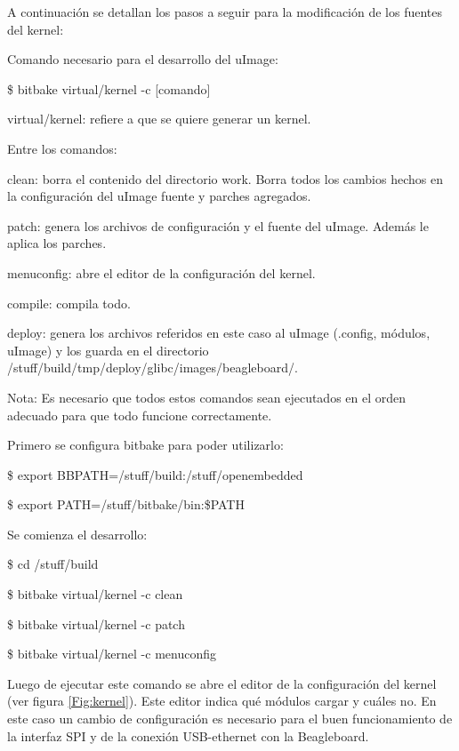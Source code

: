 \bigskip
A continuación se detallan los pasos a seguir para la modificación de los fuentes del kernel:
 
\bigskip 
Comando necesario para el desarrollo del uImage:

\bigskip
\centerline{\$ bitbake virtual/kernel -c [comando]}

\bigskip
virtual/kernel: refiere a que se quiere generar un kernel.

\bigskip
Entre los comandos:

\bigskip
clean: borra el contenido del directorio work. Borra todos los cambios hechos en la configuración del uImage fuente y parches agregados.

patch: genera los archivos de configuración y el fuente del uImage. Además le aplica los parches.

menuconfig: abre el editor de la configuración del kernel.

compile: compila todo.

deploy: genera los archivos referidos en este caso al uImage (.config, módulos, uImage) y los guarda en el directorio /stuff/build/tmp/deploy/glibc/images/beagleboard/.

\bigskip
Nota: Es necesario que todos estos comandos sean ejecutados en el orden adecuado para que todo funcione correctamente.

\bigskip
Primero se configura bitbake para poder utilizarlo:

\centerline{\$ export BBPATH=/stuff/build:/stuff/openembedded}

\centerline{\$ export PATH=/stuff/bitbake/bin:\$PATH}

\bigskip
Se comienza el desarrollo:

\centerline{\$ cd /stuff/build}

\centerline{\$ bitbake virtual/kernel -c clean}

\centerline{\$ bitbake virtual/kernel -c patch}

\centerline{\$ bitbake virtual/kernel -c menuconfig}

\bigskip
Luego de ejecutar este comando se abre el editor de la configuración del kernel (ver figura \ref{Fig:kernel}). Este editor indica qué módulos cargar y cuáles no. En este caso un cambio de  configuración es necesario para el buen funcionamiento de la interfaz SPI y de la conexión USB-ethernet con la Beagleboard.

